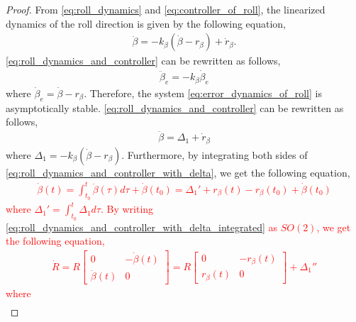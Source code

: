 \begin{proof}
    From \eqref{eq:roll_dynamics} and \eqref{eq:controller_of_roll}, the linearized dynamics of the roll direction is given by the following equation,
    \begin{align}
        \label{eq:roll_dynamics_and_controller}
        \ddot{\beta} = - k_{\beta} (\dot{\beta} - r_{\beta}) + \dot{r}_{\beta}.
    \end{align}
    \eqref{eq:roll_dynamics_and_controller} can be rewritten as follows,
    \begin{align}
        \label{eq:error_dynamics_of_roll}
        \ddot{\beta}_e = -k_{\beta} \dot{\beta}_e
    \end{align}
    where $ \dot{\beta}_e = \dot{\beta} - r_{\beta} $.
    Therefore, the system \eqref{eq:error_dynamics_of_roll} is asymptotically stable.
    \eqref{eq:roll_dynamics_and_controller} can be rewritten as follows,
    \begin{align}
        \label{eq:roll_dynamics_and_controller_with_delta}
        \ddot{\beta} = \Delta_1 + \dot{r}_{\beta}
    \end{align}
    where $ \Delta_1 = -k_{\beta} (\dot{\beta} - r_{\beta}) $.
    Furthermore, by integrating both sides of \eqref{eq:roll_dynamics_and_controller_with_delta}, we get the following equation,
    \textcolor{red}{
    \begin{align}
        \label{eq:roll_dynamics_and_controller_with_delta_integrated}
        \dot{\beta} (t) = \int_{t_0}^t \ddot{\beta} (\tau) d\tau + \dot{\beta} (t_0) = \Delta_1' + r_{\beta}(t) - r_{\beta}(t_0) + \dot{\beta} (t_0)
    \end{align}
    where $ \Delta_1' = \int_{t_0}^t \Delta_1 d\tau $.
    By writing \eqref{eq:roll_dynamics_and_controller_with_delta_integrated} as $ SO(2) $, we get the following equation,
    \begin{align}
        \label{eq:roll_dynamics_and_controller_SO(2)}
        \dot{R} = R 
        \begin{bmatrix}
            0 & -\dot{\beta}(t)\\
            \dot{\beta}(t) & 0
        \end{bmatrix} = R
        \begin{bmatrix}
            0 & -r_{\beta}(t) \\
            r_{\beta}(t) & 0
        \end{bmatrix}
        + \Delta_1''
    \end{align}
    where
    \begin{align}

\end{align}}
\end{proof}
